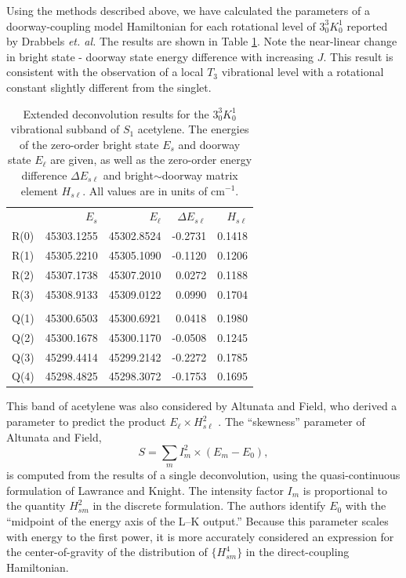 \documentclass[12pt]{mitthesis}
\begin{document}
Using the methods described above, we have calculated the parameters
of a doorway-coupling model Hamiltonian for each rotational level of
$3^3_0K^1_0$ reported by Drabbels \emph{et. al.}  The results are
shown in Table \ref{table:drabbels-deconv}.  Note the near-linear
change in bright state - doorway state energy difference with
increasing $J$.  This result is consistent with the observation of a
local $T_3$ vibrational level with a rotational constant slightly
different from the singlet.

\begin{table}
  \caption{Extended deconvolution results for the $3^3_0K^1_0$
    vibrational subband of $S_1$ acetylene.  The energies of 
    the zero-order bright state $E_s$ and doorway state $E_{\ell}$ 
    are given, as well as the zero-order energy difference $\Delta
    E_{s\ell}$ and bright$\sim$doorway matrix element $H_{s\ell}$.
    All values are in units of cm$^{-1}$.}
  \label{table:drabbels-deconv}
  \centering
  \begin{tabular}{lrrrr}
    & \\
    \toprule
    & $E_s$ & $E_{\ell}$ & $\Delta E_{s\ell}$ & $H_{s\ell}$ \\
    \midrule
    R(0) & 45303.1255 & 45302.8524 & -0.2731 & 0.1418 \\
    R(1) & 45305.2210 & 45305.1090 & -0.1120 & 0.1206 \\
    R(2) & 45307.1738 & 45307.2010 &  0.0272 & 0.1188 \\
    R(3) & 45308.9133 & 45309.0122 &  0.0990 & 0.1704 \\
    & \\
    Q(1) & 45300.6503 & 45300.6921 &  0.0418 & 0.1980 \\
    Q(2) & 45300.1678 & 45300.1170 & -0.0508 & 0.1245 \\
    Q(3) & 45299.4414 & 45299.2142 & -0.2272 & 0.1785 \\
    Q(4) & 45298.4825 & 45298.3072 & -0.1753 & 0.1695 \\
    \bottomrule
  \end{tabular}
\end{table}

This band of acetylene was also considered by Altunata and Field, who
derived a parameter to predict the product $E_{\ell} \times
H_{s\ell}^2$ \cite{altunata01}.  The ``skewness'' parameter of
Altunata and Field,
\begin{equation}
  S = \sum_m I_m^2 \times (E_m - E_0),
\end{equation}
is computed from the results of a single deconvolution, using the
quasi-continuous formulation of Lawrance and Knight.  The intensity
factor $I_m$ is proportional to the quantity $H_{sm}^2$ in the
discrete formulation.  The authors identify $E_0$ with the ``midpoint
of the energy axis of the L–K output.''  Because this parameter scales
with energy to the first power, it is more accurately considered an
expression for the center-of-gravity of the distribution of $\lbrace
H_{sm}^4\rbrace$ in the direct-coupling Hamiltonian.
\end{document}
